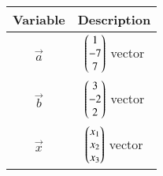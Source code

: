 \begin{tabular}[12pt]{ |c| c|}
    \hline
    \textbf{Variable} & \textbf{Description}\\ 
    \hline
	$\vec{a}$ & $\begin{pmatrix}1\\-7\\7\end{pmatrix}$ vector\\
   \hline
	$\vec{b}$ & $\begin{pmatrix}3\\-2\\2\end{pmatrix}$ vector\\
   \hline
	$\vec{x}$ & $\begin{pmatrix}x_1\\x_2\\x_3\end{pmatrix}$ vector\\
   \hline

    \end{tabular}
